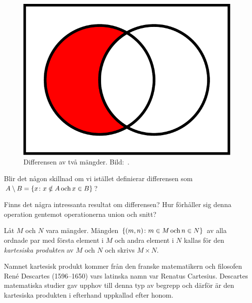 \begin{figure}
\begin{minipage}{0.3\textwidth}
  \end{minipage}
  \hfill
  \begin{minipage}{0.3\textwidth}
    \includegraphics[width=\textwidth]{figs/A_setminus_B.pdf}
  \end{minipage}
  \caption{%
    Differensen av två mängder.
    Bild:~\cite{Wikipedia2013Set}.
  }\label{fig:Differens}
\end{figure}

\begin{exercise}
  Blir det någon skillnad om vi istället definierar differensen som 
  \(A\setminus B = \{x\colon x\notin A\operatorname{och} x\in B\}\)?
\end{exercise}
\begin{exercise}
  Finns det några intressanta resultat om differensen?
  Hur förhåller sig denna operation gentemot operationerna union och snitt?
\end{exercise}

\begin{definition}\label{def:KartesiskProdukt}
  Låt \(M\) och \(N\) vara mängder.
  Mängden \(\{(m,n)\colon m\in M\operatorname{och} n\in N\}\) av alla ordnade par med första
  element i \(M\) och andra element i \(N\) 
  kallas för den \emph{kartesiska produkten} av \(M\) och \(N\) och skrivs
  \(M\times N\).
\end{definition}
Namnet kartesisk produkt kommer från den franske matematikern och filosofen
René Descartes (1596--1650) vars latinska namn var Renatus Cartesius.
Descartes matematiska studier gav upphov till denna typ av begrepp och därför
är den kartesiska produkten i efterhand uppkallad efter honom.

